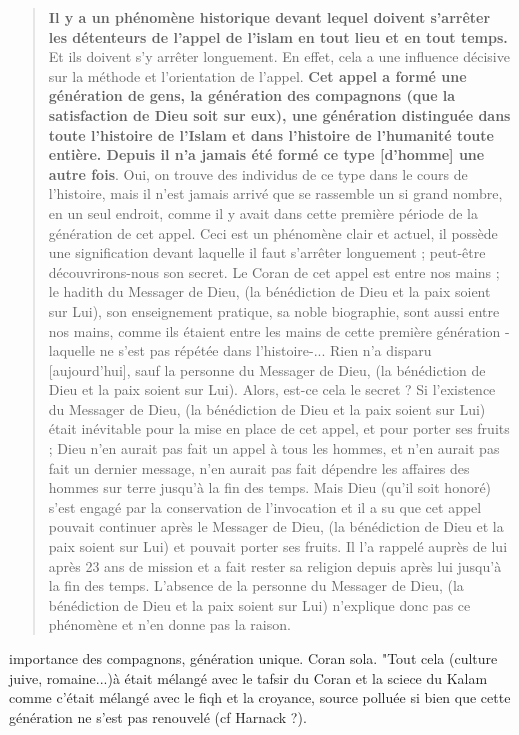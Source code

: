 \begin{quote}
    \textbf{Il y a un phénomène historique devant lequel doivent s'arrêter
les détenteurs de l'appel de l'islam en tout lieu et en tout temps.} Et
ils doivent s'y arrêter longuement. En effet, cela a une influence
décisive sur la méthode et l'orientation de l'appel. \textbf{Cet appel a
formé une génération de gens, la génération des compagnons (que la
satisfaction de Dieu soit sur eux), une génération distinguée dans toute
l'histoire de l'Islam et dans l'histoire de l'humanité toute entière.
Depuis il n'a jamais été formé ce type {[}d'homme{]} une autre fois}.
Oui, on trouve des individus de ce type dans le cours de l'histoire,
mais il n'est jamais arrivé que se rassemble un si grand nombre, en un
seul endroit, comme il y avait dans cette première période de la
génération de cet appel. Ceci est un phénomène clair et actuel, il
possède une signification devant laquelle il faut s'arrêter longuement ;
peut-être découvrirons-nous son secret. Le Coran de cet appel est entre
nos mains ; le hadith du Messager de Dieu, (la bénédiction de Dieu et la
paix soient sur Lui), son enseignement pratique, sa noble biographie,
sont aussi entre nos mains, comme ils étaient entre les mains de cette
première génération - laquelle ne s'est pas répétée dans l'histoire-...
Rien n'a disparu {[}aujourd'hui{]}, sauf la personne du Messager de
Dieu, (la bénédiction de Dieu et la paix soient sur Lui). Alors, est-ce
cela le secret ? Si l'existence du Messager de Dieu, (la bénédiction de
Dieu et la paix soient sur Lui) était inévitable pour la mise en place
de cet appel, et pour porter ses fruits ; Dieu n'en aurait pas fait un
appel à tous les hommes, et n'en aurait pas fait un dernier message,
n'en aurait pas fait dépendre les affaires des hommes sur terre jusqu'à
la fin des temps. Mais Dieu (qu'il soit honoré) s'est engagé par la
conservation de l'invocation et il a su que cet appel pouvait continuer
après le Messager de Dieu, (la bénédiction de Dieu et la paix soient sur
Lui) et pouvait porter ses fruits. Il l'a rappelé auprès de lui après 23
ans de mission et a fait rester sa religion depuis après lui jusqu'à la
fin des temps. L'absence de la personne du Messager de Dieu, (la
bénédiction de Dieu et la paix soient sur Lui) n'explique donc pas ce
phénomène et n'en donne pas la raison.
\end{quote}

\begin{Synthesis}
importance des compagnons, génération unique. Coran sola. 
"Tout cela (culture juive, romaine...)à était mélangé avec le tafsir du Coran et la sciece du Kalam comme c'était mélangé avec le fiqh et la croyance, source polluée si bien que cette génération ne s'est pas renouvelé (cf Harnack ?). 

\end{Synthesis}

